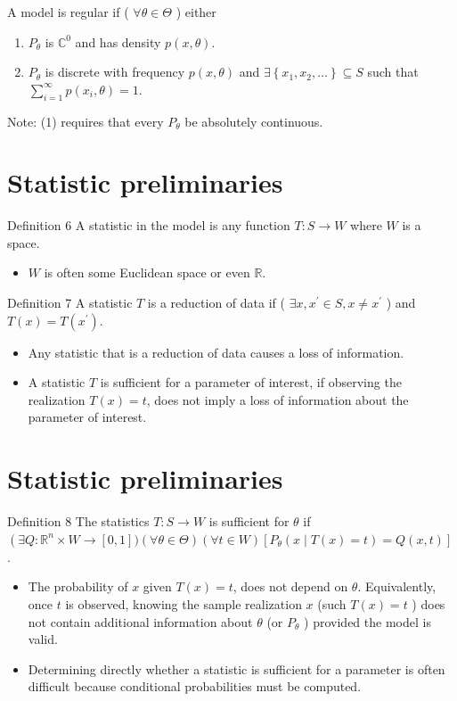 \documentclass[10pt]{article}
\begin{document}
A model is regular if ( $\forall \theta \in \Theta$ ) either

\begin{enumerate}
  \item $P_{\theta}$ is $\mathbb{C}^{0}$ and has density $p(x, \theta)$.
  \item $P_{\theta}$ is discrete with frequency $p(x, \theta)$ and $\exists\left\{x_{1}, x_{2}, \ldots\right\} \subseteq S$ such that $\sum_{i=1}^{\infty} p\left(x_{i}, \theta\right)=1$.
\end{enumerate}

Note: (1) requires that every $P_{\theta}$ be absolutely continuous.

\section*{Statistic preliminaries}
Definition 6 A statistic in the model is any function $T: S \rightarrow W$ where $W$ is a space.

\begin{itemize}
  \item $W$ is often some Euclidean space or even $\mathbb{R}$.
\end{itemize}

Definition 7 A statistic $T$ is a reduction of data if ( $\exists x, x^{\prime} \in S, x \neq x^{\prime}$ ) and $T(x)=T\left(x^{\prime}\right)$.

\begin{itemize}
  \item Any statistic that is a reduction of data causes a loss of information.
  \item A statistic $T$ is sufficient for a parameter of interest, if observing the realization $T(x)=t$, does not imply a loss of information about the parameter of interest.
\end{itemize}

\section*{Statistic preliminaries}
Definition 8 The statistics $T: S \rightarrow W$ is sufficient for $\theta$ if $\left(\exists Q: \mathbb{R}^{n}\right. \times W \rightarrow[0,1])(\forall \theta \in \Theta)(\forall t \in W)\left[P_{\theta}(x \mid T(x)=t)=Q(x, t)\right]$.

\begin{itemize}
  \item The probability of $x$ given $T(x)=t$, does not depend on $\theta$. Equivalently, once $t$ is observed, knowing the sample realization $x$ (such $T(x)=t$ ) does not contain additional information about $\theta$ (or $P_{\theta}$ ) provided the model is valid.
  \item Determining directly whether a statistic is sufficient for a parameter is often difficult because conditional probabilities must be computed.
\end{itemize}
\end{document}
